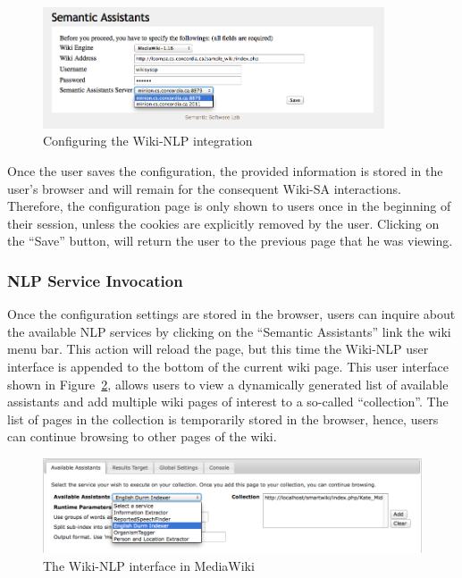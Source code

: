 \begin{figure}[ht]
\centering
\includegraphics[width=0.9\textwidth]{pictures/wiki_config.png}
\caption{Configuring the Wiki-NLP integration}
\label{fig:wiki_config}
\end{figure}

Once the user saves the configuration, the provided information is stored in the user's browser and will remain for the consequent Wiki-SA interactions. Therefore, the configuration page is only shown to users once in the beginning of their session, unless the cookies are explicitly removed by the user. Clicking on the ``Save'' button, will return the user to the previous page that he was viewing.

\subsubsection{NLP Service Invocation}
Once the configuration settings are stored in the browser, users can inquire about the available NLP services by clicking on the ``Semantic Assistants'' link the wiki menu bar. This action will reload the page, but this time the Wiki-NLP user interface is appended to the bottom of the current wiki page. This user interface shown in Figure~\ref{fig:semassist_ui}, allows users to view a dynamically generated list of available assistants and add multiple wiki pages of interest to a so-called ``collection''. The list of pages in the collection is temporarily stored in the browser, hence, users can continue browsing to other pages of the wiki.

\begin{figure}
\centering
\includegraphics[width=\textwidth]{pictures/semassist_ui.png}
\caption{The Wiki-NLP interface in MediaWiki}
\label{fig:semassist_ui}
\end{figure}

